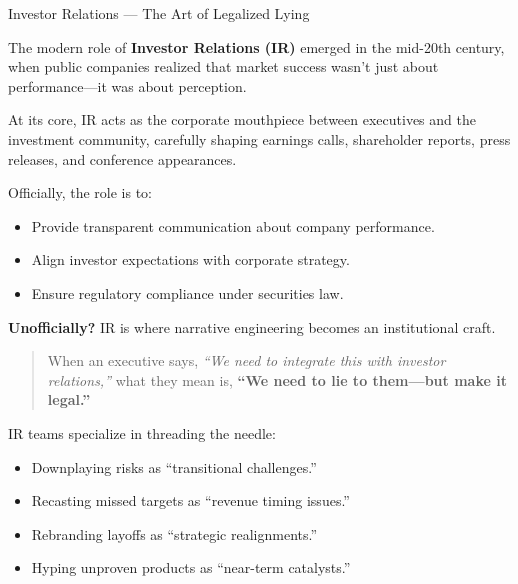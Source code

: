 \begin{HistoricalSidebar}{Investor Relations --- The Art of Legalized Lying}

    The modern role of \textbf{Investor Relations (IR)} emerged in the mid-20th century,  
    when public companies realized that market success wasn’t just about performance—it was about perception.
    
    \medskip
    
    At its core, IR acts as the corporate mouthpiece between executives and the investment community,  
    carefully shaping earnings calls, shareholder reports, press releases, and conference appearances.

    \medskip
    
    Officially, the role is to:

    \medskip

    \begin{itemize}
        \item Provide transparent communication about company performance.
        \item Align investor expectations with corporate strategy.
        \item Ensure regulatory compliance under securities law.
    \end{itemize}
    
    \medskip
    
    \textbf{Unofficially?}  
    IR is where narrative engineering becomes an institutional craft.
    
    \medskip
    
    \begin{quote}
    When an executive says, \textit{“We need to integrate this with investor relations,”}  
    what they mean is,  
    \textbf{“We need to lie to them—but make it legal.”}
    \end{quote}
    
    \medskip
    
    IR teams specialize in threading the needle:

    \medskip

    \begin{itemize}
        \item Downplaying risks as “transitional challenges.”
        \item Recasting missed targets as “revenue timing issues.”
        \item Rebranding layoffs as “strategic realignments.”
        \item Hyping unproven products as “near-term catalysts.”
    \end{itemize}
    

\end{HistoricalSidebar}
